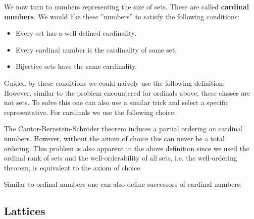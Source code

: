     We now turn to numbers representing the size of sets. These are called \textbf{cardinal numbers}. We would like these ''numbers'' to satisfy the following conditions:
    \begin{itemize}
        \item Every set has a well-defined cardinality.
        \item Every cardinal number is the cardinality of some set.
        \item Bijective sets have the same cardinality.
    \end{itemize}
    Guided by these conditions we could naively use the following definition:
    However, similar to the problem encountered for ordinals above, these classes are not sets. To solve this one can also use a similar trick and select a specific representative. For cardinals we use the following choice:

    \begin{remark}[Ordering]
        The Cantor-Bernstein-Schr\"oder theorem induces a partial ordering on cardinal numbers. However, without the axiom of choice this can never be a total ordering. This problem is also apparent in the above definition since we used the ordinal rank of sets and the well-orderability of all sets, i.e. the well-ordering theorem, is equivalent to the axiom of choice.
    \end{remark}

    Similar to ordinal numbers one can also define successors of cardinal numbers:

\subsection{Lattices}

